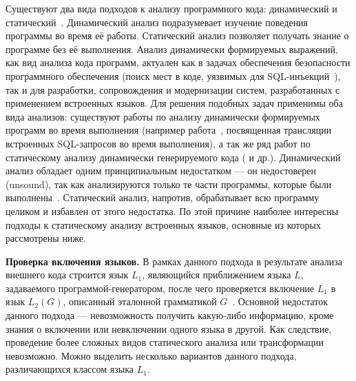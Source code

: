 Существуют два вида подходов к анализу программного кода: динамический и статический~\cite{StaticDynamicAnalysis}. Динамический анализ подразумевает изучение поведения программы во время её работы. Статический анализ позволяет получать знание о программе без её выполнения. Анализ динамически формируемых выражений, как вид анализа кода программ, актуален как в задачах обеспечения безопасности программного обеспечения (поиск мест в коде, уязвимых для SQL-инъекций~\cite{SQLInjection}), так и для разработки, сопровождения и модернизации систем, разработанных с применением встроенных языков. Для решения подобных задач применимы оба вида анализов: существуют работы по анализу динамически формируемых программ во время выполнения (например работа~\cite{DynamicDSQLTranslation}, посвященная трансляции встроенных SQL-запросов во время выполнения), а так же ряд работ по статическому анализу динамически генерируемого кода (\cite{Alvor1,JSA,PHPSA,RegOverApprox}  и др.). Динамический анализ обладает одним принципиальным недостатком --- он недостоверен (unsound), так как анализируются только те части программы, которые были выполнены~\cite{StaticDynamicAnalysis}. Статический анализ, напротив, обрабатывает всю программу целиком и избавлен от этого недостатка. По этой причине наиболее интересны подходы к статическому анализу встроенных языков, основные из которых рассмотрены ниже.

\textbf{Проверка включения языков.} В рамках данного подхода в результате анализа внешнего кода строится язык $L_1$, являющийся приближением языка $L$, задаваемого программой-генератором, после чего проверяется включение $L_1$ в язык $L_2(G)$, описанный эталонной грамматикой $G$~\cite{JSA, PHPSA}. Основной недостаток данного подхода --- невозможность получить какую-либо информацию, кроме знания о включении или невключении одного языка в другой. Как следствие, проведение более сложных видов статического анализа или трансформации невозможно. Можно выделить несколько вариантов данного подхода, различающихся классом языка $L_1$.

